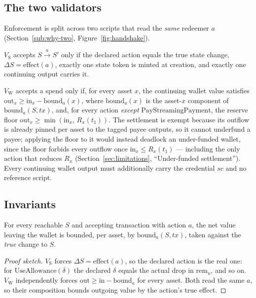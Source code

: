 \documentclass[11pt,DIV=11,parskip=half-]{scrartcl}
\begin{document}
\subsection{The two validators}
Enforcement is split across two scripts that read the \emph{same} redeemer $a$ (Section~\ref{sub:why-two}, Figure~\ref{fig:handshake}).
\begin{definition}
$V_{\mathrm{S}}$ accepts $S \xrightarrow{a} S'$ only if the declared action equals the true state change, $\Delta S = \mathrm{effect}(a)$, exactly one state token is minted at creation, and exactly one continuing output carries it.
\end{definition}
\begin{definition}
$V_{\mathrm{W}}$ accepts a spend only if, for every asset $x$, the continuing wallet value satisfies $\mathrm{out}_x \ge \mathrm{in}_x - \mathrm{bound}_a(x)$, where $\mathrm{bound}_a(x)$ is the asset-$x$ component of $\mathrm{bound}_a(S, \mathit{tx})$, and, for every action \emph{except} $\mathrm{PayStreamingPayment}$, the reserve floor $\mathrm{out}_x \ge \min(\mathrm{in}_x,\, R_x(t_1))$. The settlement is exempt because its outflow is already pinned per asset to the tagged payee outputs, so it cannot underfund a payee; applying the floor to it would instead deadlock an under-funded wallet, since the floor forbids every outflow once $\mathrm{in}_x \le R_x(t_1)$ --- including the only action that reduces $R_x$ (Section~\ref{sec:limitations}, ``Under-funded settlement''). Every continuing wallet output must additionally carry the credential $\mathit{sc}$ and no reference script.
\end{definition}

\subsection{Invariants}
\begin{theorem}
For every reachable $S$ and accepting transaction with action $a$, the net value leaving the wallet is bounded, per asset, by $\mathrm{bound}_a(S, \mathit{tx})$, taken against the \emph{true} change to $S$.
\end{theorem}
\begin{proof}[Proof sketch]
$V_{\mathrm{S}}$ forces $\Delta S = \mathrm{effect}(a)$, so the declared action is the real one: for $\mathrm{UseAllowance}(\delta)$ the declared $\delta$ equals the actual drop in $\mathrm{rem}_u$, and so on. $V_{\mathrm{W}}$ independently forces $\mathrm{out} \ge \mathrm{in} - \mathrm{bound}_a$ for every asset. Both read the same $a$, so their composition bounds outgoing value by the action's true effect.
\end{proof}
\end{document}
